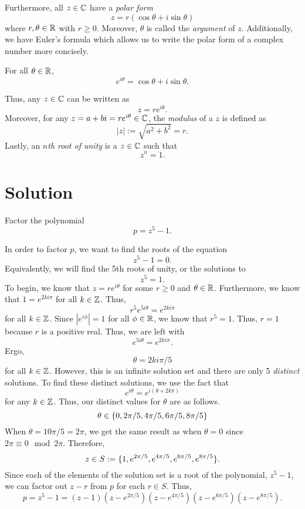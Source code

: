 \documentclass[notitlepage]{problem-solving}
\begin{document}
\noindent Furthermore, all $z\in\mathbb{C}$ have a \textit{polar form}
\[
	z=r(\cos\theta+i\sin\theta)
\]
where $r,\theta\in\mathbb{R}$ with $r\geq 0$.
Moreover, $\theta$ is called the \textit{argument} of $z$.
Additionally, we have Euler's formula which allows us to write the polar form of a complex number more concisely.
\begin{thm}
	For all $\theta\in\mathbb{R}$,
	\[
		e^{i\theta} = \cos\theta+i\sin\theta.
	\]
\end{thm}
\noindent Thus, any $z\in\mathbb{C}$ can be written as
\[
	z=re^{i\theta}.
\]
Moreover, for any $z=a+bi=re^{i\theta}\in\mathbb{C}$, the \textit{modulus} of a $z$ is defined as
\[
	|z| := \sqrt{a^2+b^2} = r.
\]
Lastly, an \textit{$n$th root of unity} is a $z\in\mathbb{C}$ such that
\[
	z^n = 1.
\]

\section{Solution}

\begin{problem*}
	Factor the polynomial
	\[
		p=z^5-1.
	\]
\end{problem*}

\noindent In order to factor $p$, we want to find the roots of the equation
\[
	z^5 - 1= 0.
\]
Equivalently, we will find the 5th roots of unity, or the solutions to
\[
	z^5 = 1.
\]
To begin, we know that $z=re^{i\theta}$ for some $r\geq 0$ and $\theta\in\mathbb{R}$.
Furthermore, we know that $1=e^{2ki\pi}$ for all $k\in\mathbb{Z}$.
Thus,
\[
	r^5e^{5i\theta} = e^{2ki\pi}
\]
for all $k\in\mathbb{Z}$.
Since $|e^{i\phi}| = 1$ for all $\phi\in\mathbb{R}$, we know that $r^5 = 1$.
Thus, $r=1$ because $r$ is a positive real.
Thus, we are left with
\[
	e^{5i\theta}=e^{2ki\pi}.
\]
Ergo,
\[
	\theta = 2ki\pi/5
\]
for all $k\in\mathbb{Z}$.
However, this is an infinite solution set and there are only 5 \textit{distinct} solutions.
To find these distinct solutions, we use the fact that
\[
	e^{i\theta} = e^{i(\theta+2k\pi)}
\]
for any $k\in\mathbb{Z}$.
Thus, our distinct values for $\theta$ are as follows.
\[
	\theta\in\lbrace 0, 2\pi/5, 4\pi/5, 6\pi/5, 8\pi/5 \rbrace
\]
When $\theta =10\pi/5 = 2\pi$, we get the same result as when $\theta=0$ since $2\pi\equiv 0\mod{2\pi}$.
Therefore,
\[
	z\in S:=\lbrace 1,e^{2\pi/5}, e^{4\pi/5}, e^{6\pi/5}, e^{8\pi/5} \rbrace.
\]
Since each of the elements of the solution set is a root of the polynomial, $z^5-1$, we can factor out $z-r$ from $p$ for each $r\in S$.
Thus,
\[
	p = z^5-1=(z-1)(z-e^{2\pi/5})(z-e^{4\pi/5})(z-e^{6\pi/5})(z-e^{8\pi/5}).
\]
\end{document}

